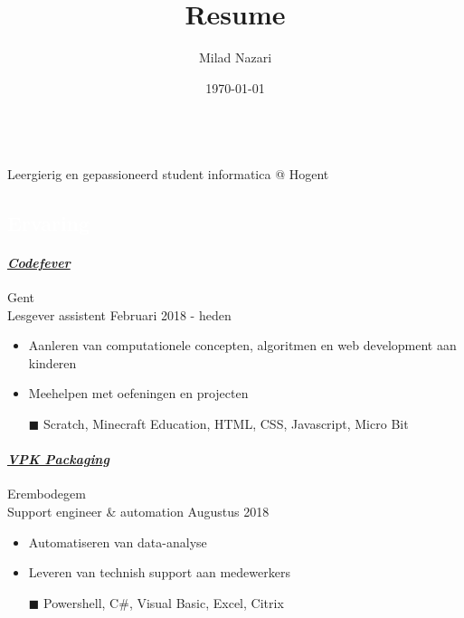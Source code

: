 \documentclass[a4paper, twoside]{article}
\title{Resume}
\author{Milad Nazari}
\date{\today}
\begin{document}
\begin{multicols}{2}
    \\
    \noindent Leergierig en gepassioneerd student informatica @ Hogent
    \paragraph{}
    \hfill{}\par
    \hfill{}\par    
    \hfill{}\par
\end{multicols}

\begin{mdframed}
\section*{\textcolor{white}{Ervaring}}
\end{mdframed}

\paragraph{\textbf{\textit{\href{https://codefever.be}{\textcolor{blueDark}{Codefever}}}}} \hfill\small Gent \\
Lesgever assistent \hfill\small Februari 2018 - heden
\begin{itemize}
    \itemsep-0.2em 
    \item Aanleren van computationele concepten, algoritmen en web development aan kinderen
    \item Meehelpen met oefeningen en projecten
    \item[\color{orange}$\blacksquare$] Scratch, Minecraft Education, HTML, CSS, Javascript, Micro Bit
\end{itemize}

\paragraph{\textbf{\textit{\href{https://vpkgroup.com/}{\textcolor{blueDark}{VPK Packaging}}}}} \hfill\small Erembodegem\\
Support engineer \& automation \hfill\small Augustus 2018
\begin{itemize}
    \itemsep-0.2em 
    \item Automatiseren van data-analyse
    \item Leveren van technish support aan medewerkers
    \item[\color{orange}$\blacksquare$] Powershell, C\#, Visual Basic, Excel, Citrix
\end{itemize}
\end{document}
